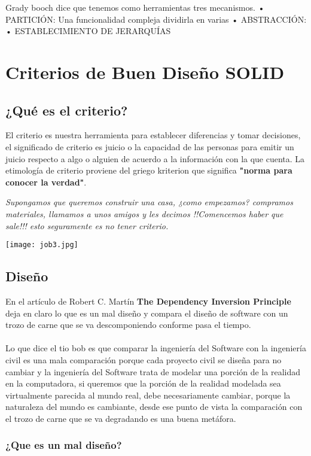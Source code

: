 \documentclass[12pt]{book}
\begin{document}
Grady booch dice que tenemos como herramientas tres mecanismos.
    • PARTICIÓN: Una funcionalidad compleja dividirla en varias 
    • ABSTRACCIÓN: 
    • ESTABLECIMIENTO DE JERARQUÍAS

\chapter{Criterios de Buen Diseño SOLID}
\section{¿Qué es el criterio?} 
El criterio es nuestra herramienta para establecer diferencias y tomar decisiones, el significado de criterio es juicio o la capacidad de las personas para emitir un juicio respecto a algo o alguien de acuerdo a la información con la que cuenta. La etimología de criterio proviene del griego kriterion que significa \textbf{"norma para conocer la verdad"}.
\begin{center}
\textit{Supongamos que queremos construir una casa, ¿como empezamos? compramos materiales, llamamos a unos amigos y les decimos !!Comencemos haber que sale!!! esto seguramente es no tener criterio.
}\end{center}
\begin{center}
\texttt{[image: job3.jpg]}
\end{center}
\section{Diseño}
En el artículo de Robert C. Martín \textbf{The Dependency Inversion Principle} deja en claro lo que es un mal diseño y compara el diseño de software con un trozo de carne que se va descomponiendo conforme pasa el tiempo.
\\
\\
Lo que dice el tio bob es que comparar la ingeniería del Software con la ingeniería civil es una mala comparación porque cada proyecto civil se diseña para no cambiar y la ingeniería del Software trata de modelar una porción de la realidad en la computadora, si queremos que la porción de la realidad modelada sea virtualmente parecida al mundo real, debe necesariamente cambiar, porque la naturaleza del mundo es cambiante, desde ese punto de vista la comparación con el trozo de carne que se va degradando es una buena metáfora.
\subsection{¿Que es un mal diseño?}
\end{document}
